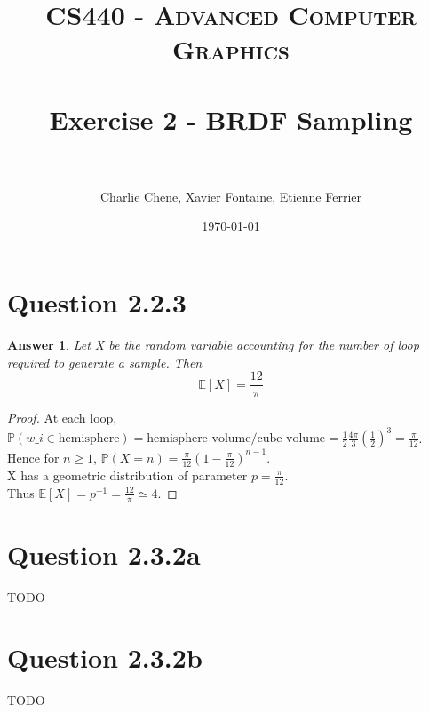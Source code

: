 \documentclass[paper=a4, fontsize=11pt]{scrartcl} %
\title{	
\normalfont \normalsize 
\textsc{CS440 - Advanced Computer Graphics} \\ [25pt] %
\horrule{0.5pt} \\[0.4cm] %
\huge Exercise 2 - BRDF Sampling \\ %
\horrule{0.5pt} \\[0.5cm] %
}
\author{Charlie Chene, Xavier Fontaine, Etienne Ferrier} %
\date{\normalsize\today} %
\numberwithin{equation}{section} %
\numberwithin{figure}{section} %
\numberwithin{table}{section} %
\newtheorem*{answer}{Answer}
\begin{document}
\maketitle %

\section*{Question 2.2.3}
\begin{answer}
	Let X be the random variable accounting for the number of loop required to generate a sample. Then $$\mathbb{E}[X] = \dfrac{12}{\pi}$$
\end{answer}

\begin{proof}
	At each loop, $\mathbb{P}(w\_i \in \text{hemisphere}) = \text{hemisphere volume/cube volume} = \frac{1}{2} \frac{4\pi}{3}(\frac{1}{2})^3 = \frac{\pi}{12}$.\\
	Hence for $n \geq 1$, $\mathbb{P}(X = n) = \frac{\pi}{12}(1 - \frac{\pi}{12})^{n-1}$. \\X has a geometric distribution of parameter $p = \frac{\pi}{12}$.\\ Thus $\mathbb{E}[X] = p^{-1} = \frac{12}{\pi} \simeq 4$. 	
\end{proof}


\section*{Question 2.3.2a}

TODO

\section*{Question 2.3.2b}

TODO
\end{document}

